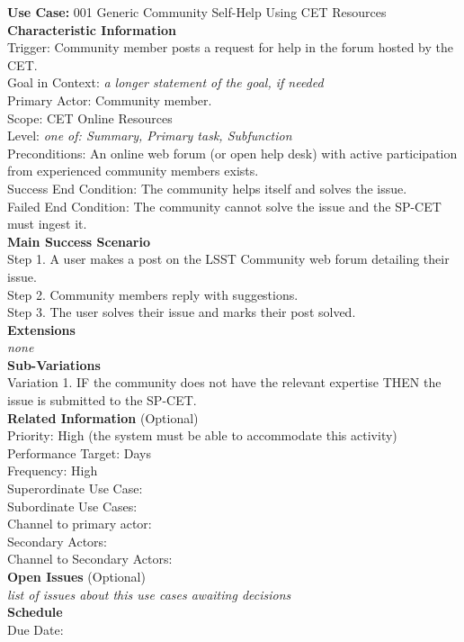 {\bf Use Case:} 001 Generic Community Self-Help Using CET Resources \\

{\bf Characteristic Information} \\
Trigger: Community member posts a request for help in the forum hosted by the CET. \\
Goal in Context: {\it a longer statement of the goal, if needed} \\
Primary Actor: Community member. \\
Scope: CET Online Resources \\
Level: {\it one of: Summary, Primary task, Subfunction} \\
Preconditions: An online web forum (or open help desk) with active participation from experienced community members exists. \\
Success End Condition: The community helps itself and solves the issue. \\
Failed End Condition: The community cannot solve the issue and the SP-CET must ingest it. \\

{\bf Main Success Scenario} \\
Step 1. A user makes a post on the LSST Community web forum detailing their issue.\\
Step 2. Community members reply with suggestions.\\
Step 3. The user solves their issue and marks their post solved.\\

{\bf Extensions} \\
{\it none} \\

{\bf Sub-Variations} \\
Variation 1. IF the community does not have the relevant expertise THEN the issue is submitted to the SP-CET. \\

{\bf Related Information} (Optional) \\
Priority: High (the system must be able to accommodate this activity) \\
Performance Target: Days \\
Frequency: High \\
Superordinate Use Case:  \\
Subordinate Use Cases:  \\
Channel to primary actor:  \\
Secondary Actors:  \\
Channel to Secondary Actors:  \\

{\bf Open Issues} (Optional) \\
{\it list of issues about this use cases awaiting decisions} \\

{\bf Schedule} \\
Due Date: \\
